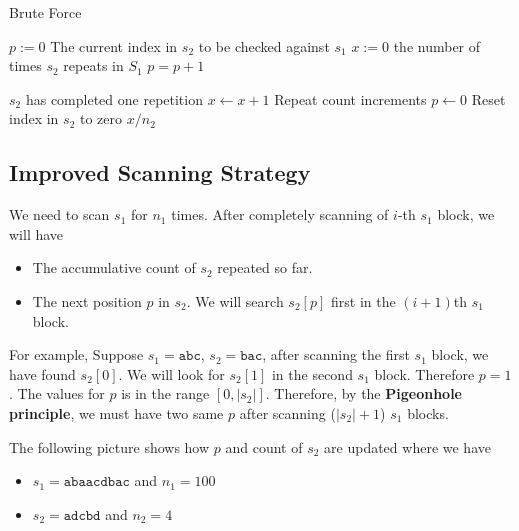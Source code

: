 \setcounter{algorithm}{0}
\begin{algorithm}[H]
\caption{Brute Force}
\begin{algorithmic}[1]
\State $p := 0$ \Comment The current index in $s_2$ to be checked against $s_1$
\State $x := 0$ \Comment the number of times $s_2$ repeats in $S_1$
\State $p = p+1$
\EndIf
{}
\end{algorithmic}
\end{algorithm}
\begin{algorithm}[H]
\begin{algorithmic}[1]
 \Comment $s_2$ has completed one repetition 
\State $x \gets x + 1$ \Comment Repeat count increments
\State $p \gets 0$ \Comment Reset index in $s_2$ to zero
\EndIf
\EndFor
\EndFor
\State \Return $x/n_2$
\EndProcedure
\end{algorithmic}
\end{algorithm}

\subsection{Improved Scanning Strategy}
We need to scan $s_1$ for $n_1$ times. After completely scanning of $i$-th $s_1$ block, we will have

\begin{itemize}
\item The accumulative count of $s_2$ repeated so far.
\item The next position $p$ in $s_2$. We will search $s_2[p]$ first in the $(i+1)$th $s_1$ block.
\end{itemize}

For example, Suppose $s_1=\texttt{abc}$, $s_2=\texttt{bac}$, after scanning the first $s_1$ block, we have found $s_2[0]$. We will look for $s_2[1]$ in the second $s_1$ block. Therefore $p=1$. The values for $p$ is in the range $[0, \lvert s_2\rvert]$. Therefore, by the \textbf{Pigeonhole principle}, we must have two same $p$ after scanning ($\lvert s_2\rvert + 1$) $s_1$ blocks.

The following picture shows how $p$ and count of $s_2$ are updated where we have 

\begin{itemize}
\item $s_1=\texttt{abaacdbac}$ and $n_1=100$
\item $s_2=\texttt{adcbd}$ and $n_2=4$
\end{itemize}

